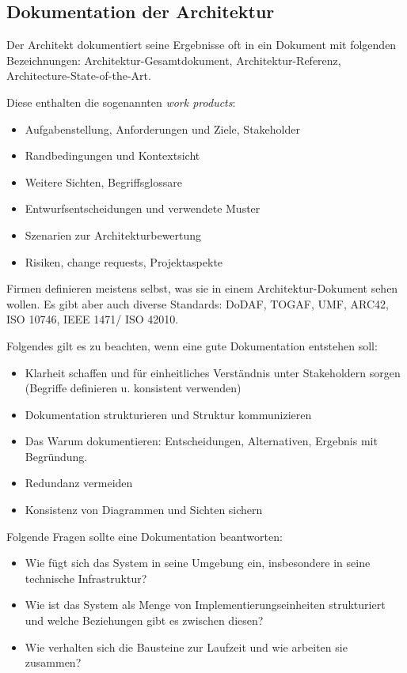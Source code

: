 \subsection{Dokumentation der Architektur}
Der Architekt dokumentiert seine Ergebnisse oft in ein Dokument mit folgenden Bezeichnungen: Architektur-Gesamtdokument, Architektur-Referenz, Architecture-State-of-the-Art.

Diese enthalten die sogenannten \emph{work products}:
\begin{itemize}
	\item Aufgabenstellung, Anforderungen und Ziele, Stakeholder
	\item Randbedingungen und Kontextsicht
	\item Weitere Sichten, Begriffsglossare
	\item Entwurfsentscheidungen und verwendete Muster
	\item Szenarien zur Architekturbewertung
	\item Risiken, change requests, Projektaspekte
\end{itemize}

Firmen definieren meistens selbst, was sie in einem Architektur-Dokument sehen wollen. Es gibt aber auch diverse Standards: DoDAF, TOGAF, UMF, ARC42, ISO 10746, IEEE 1471/ ISO 42010.

Folgendes gilt es zu beachten, wenn eine gute Dokumentation entstehen soll:
\begin{itemize}
	\item Klarheit schaffen und für einheitliches Verständnis unter Stakeholdern sorgen (Begriffe definieren u. konsistent verwenden)
	\item Dokumentation strukturieren und Struktur kommunizieren
	\item Das Warum dokumentieren: Entscheidungen, Alternativen, Ergebnis mit Begründung.
	\item Redundanz vermeiden
	\item Konsistenz von Diagrammen und Sichten sichern
\end{itemize}

Folgende Fragen sollte eine Dokumentation beantworten:
\begin{itemize}
	\item Wie fügt sich das System in seine Umgebung ein, insbesondere in seine technische Infrastruktur?
	\item Wie ist das System als Menge von Implementierungseinheiten strukturiert und welche Beziehungen gibt es zwischen diesen?
	\item Wie verhalten sich die Bausteine zur Laufzeit und wie arbeiten sie zusammen?
\end{itemize}

